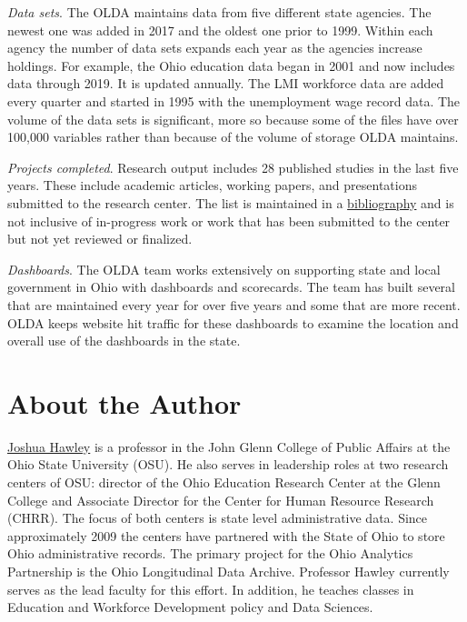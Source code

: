 \emph{Data sets}. The OLDA maintains data from five different state agencies. The newest one was added in 2017 and the oldest one prior to 1999. Within each agency the number of data sets expands each year as the agencies increase holdings. For example, the Ohio education data began in 2001 and now includes data through 2019. It is updated annually. The LMI workforce data are added every quarter and started in 1995 with the unemployment wage record data. The volume of the data sets is significant, more so because some of the files have over 100,000 variables rather than because of the volume of storage OLDA maintains.

\emph{Projects completed}. Research output includes 28 published studies in the last five years. These include academic articles, working papers, and presentations submitted to the research center. The list is maintained in a \href{https://www.chrr.ohio-state.edu/content/olda_bib/olda_bib.html}{bibliography} and is not inclusive of in-progress work or work that has been submitted to the center but not yet reviewed or finalized.

\emph{Dashboards}. The OLDA team works extensively on supporting state and local government in Ohio with dashboards and scorecards. The team has built several that are maintained every year for over five years and some that are more recent. OLDA keeps website hit traffic for these dashboards to examine the location and overall use of the dashboards in the state.

\hypertarget{about-the-author-2}{%
\section*{About the Author}\label{about-the-author-2}}

\href{http://glenn.osu.edu/faculty/glenn-faculty/hawley/}{Joshua Hawley} is a professor in the John Glenn College of Public Affairs at the Ohio State University (OSU). He also serves in leadership roles at two research centers of OSU: director of the Ohio Education Research Center at the Glenn College and Associate Director for the Center for Human Resource Research (CHRR). The focus of both centers is state level administrative data. Since approximately 2009 the centers have partnered with the State of Ohio to store Ohio administrative records. The primary project for the Ohio Analytics Partnership is the Ohio Longitudinal Data Archive. Professor Hawley currently serves as the lead faculty for this effort. In addition, he teaches classes in Education and Workforce Development policy and Data Sciences.

